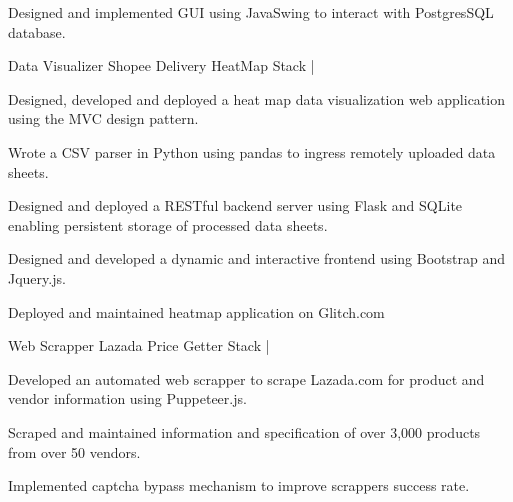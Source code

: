 \begin{cventries}
{\begin{cvitems}
        \item Designed and implemented GUI using JavaSwing to interact with PostgresSQL database.
        \end{cvitems}
    }
    \cventry
    {Data Visualizer} %
    {Shopee Delivery HeatMap} %
    {\href{https://github.com/giathuan123/HeatMap}{\faGithubSquare}} %
    {Stack | \diExpressOriginal \diNodejsPlain \diBootstrapPlain \diJqueryPlain \diPythonPlain } %
    {
        \begin{cvitems} %
          \item Designed, developed and deployed a heat map data visualization web application using the MVC design pattern.
          \item Wrote a CSV parser in Python using pandas to ingress remotely uploaded data sheets.
          \item Designed and deployed a RESTful backend server using Flask and SQLite enabling persistent storage of processed data sheets.
          \item Designed and developed a dynamic and interactive frontend using Bootstrap and Jquery.js.
          \item Deployed and maintained heatmap application on Glitch.com
        \end{cvitems}
    }
    \cventry
    {Web Scrapper} %
    {Lazada Price Getter} %
    {\faGithubSquare} %
    {Stack | \diNodejsPlain \space \space  } %
    {
        \begin{cvitems} %
        \item Developed an automated web scrapper to scrape Lazada.com for product and vendor information using Puppeteer.js.
        \item Scraped and maintained information and specification of over 3,000 products from over 50 vendors.
        \item Implemented captcha bypass mechanism to improve scrappers success rate.
        \end{cvitems}
    }
\end{cventries}
